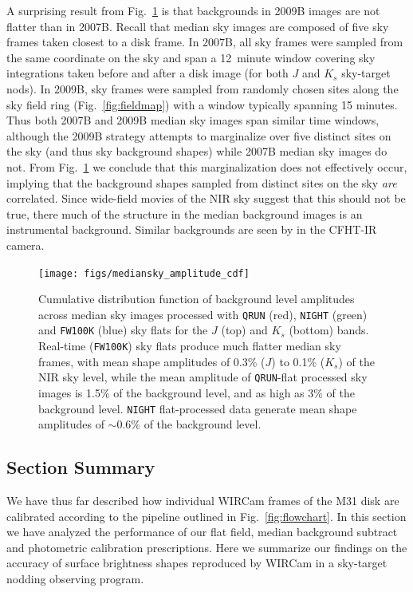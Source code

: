 \documentclass[iop]{emulateapj}
\newcommand{\Fig}[1]{Fig.~\ref{fig:#1}}  %
\begin{document}
A surprising result from \Fig{mediansky_amplitude} is that backgrounds in 2009B images are not flatter than in 2007B.
Recall that median sky images are composed of five sky frames taken closest to a disk frame.
In 2007B, all sky frames were sampled from the same coordinate on the sky and span a 12~minute window covering sky integrations taken before and after a disk image (for both $J$ and $K_s$ sky-target nods).
In 2009B, sky frames were sampled from randomly chosen sites along the sky field ring (\Fig{fieldmap}) with a window typically spanning 15 minutes.
Thus both 2007B and 2009B median sky images span similar time windows, although the 2009B strategy attempts to marginalize over five distinct sites  on the sky (and thus sky background shapes) while 2007B median sky images do not.
From \Fig{mediansky_amplitude} we conclude that this marginalization does not effectively occur, implying that the background shapes sampled from distinct sites on the sky \emph{are} correlated.
Since wide-field movies of the NIR sky \citep{Adams:1996} suggest that this should not be true, there much of the structure in the median background images is an instrumental background.
Similar backgrounds are seen by \cite{Vaduvescu:2004} in the CFHT-IR camera.

\begin{figure}[t]
\centering
\texttt{[image: figs/mediansky\_amplitude\_cdf]}
\caption{Cumulative distribution function of background level amplitudes across median sky images processed with \texttt{QRUN} (red), \texttt{NIGHT} (green) and \texttt{FW100K} (blue) sky flats for the $J$ (top) and $K_s$ (bottom) bands. Real-time (\texttt{FW100K}) sky flats produce much flatter median sky frames, with mean shape amplitudes of 0.3\% ($J$) to 0.1\% ($K_s$) of the NIR sky level, while the mean amplitude of \texttt{QRUN}-flat processed sky images is 1.5\% of the background level, and as high as 3\% of the background level. \texttt{NIGHT} flat-processed data generate mean shape amplitudes of $\sim 0.6\%$ of the background level.
}
\label{fig:mediansky_amplitude}
\end{figure}


\subsection{Section Summary}
\label{sec:shapeconclusions}

We have thus far described how individual WIRCam frames of the M31 disk are calibrated according to the pipeline outlined in \Fig{flowchart}.
In this section we have analyzed the performance of our flat field, median background subtract and photometric calibration prescriptions.
Here we summarize our findings on the accuracy of surface brightness shapes reproduced by WIRCam in a sky-target nodding observing program.
\end{document}
